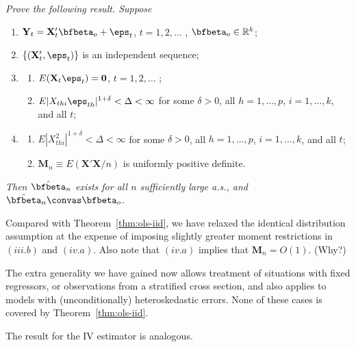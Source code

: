 \begin{exercises}
\item\label{ex:ols-ind-het} \emph{Prove the following result. Suppose}
\begin{enumerate}[label=(\roman*)]
\item $\mathbf{Y}_t = \mathbf{X}_t' \bfbeta_o + \eps_t$, \quad $t = 1, 2, \ldots$ , $\bfbeta_o \in \mathbb{R}^k$;
\item $\{(\mathbf{X}_t', \eps_t)\}$ is an independent sequence;
\item \begin{enumerate}[label=(\alph*)]
\item $E(\mathbf{X}_t \eps_t) = \mathbf{0}$, \quad $t = 1, 2, \ldots$ ;
\item $E|X_{thi} \eps_{th}|^{1+\delta} < \Delta < \infty$ for some $\delta > 0$, all $h = 1, \ldots, p$, $i = 1, \ldots, k$, and all $t$;
\end{enumerate}
\item \begin{enumerate}[label=(\alph*)]
\item $E|X_{thi}^2|^{1+\delta} < \Delta < \infty$ for some $\delta > 0$, all $h = 1, \ldots, p$, $i = 1, \ldots, k$, and all $t$;
\item $\mathbf{M}_n \equiv E(\mathbf{X}'\mathbf{X}/n)$ is uniformly positive definite.
\end{enumerate}
\end{enumerate}
\emph{Then $\hat{\bfbeta}_n$ exists for all $n$ sufficiently large a.s., and $\hat{\bfbeta}_n \convas \bfbeta_o$.}
\end{exercises}

Compared with Theorem~\ref{thm:ols-iid}, we have relaxed the identical distribution assumption at the expense of imposing slightly greater moment restrictions in $(iii.b)$ and $(iv.a)$. Also note that $(iv.a)$ implies that $\mathbf{M}_n = O(1)$. (Why?)

The extra generality we have gained now allows treatment of situations with fixed regressors, or observations from a stratified cross section, and also applies to models with (unconditionally) heteroskedastic errors. None of these cases is covered by Theorem~\ref{thm:ols-iid}.

The result for the IV estimator is analogous.

